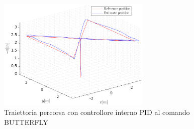 \begin{figure}
	\centering
	\includegraphics[width=0.65\textwidth]{Simulazioni/Figure/PID/BUTTERFLY/Trajectory}
	\caption{Traiettoria percorsa con controllore interno PID al comando BUTTERFLY}
\end{figure}

